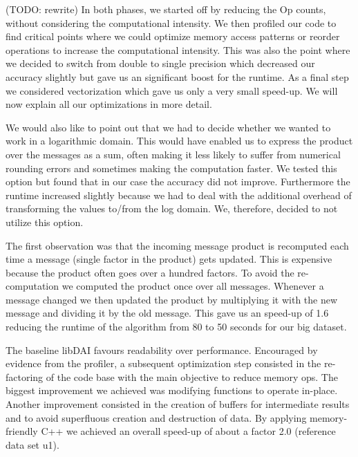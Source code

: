(TODO: rewrite) 
In both phases, we started off by reducing the Op counts, without considering the computational intensity. We then profiled our code to find critical points where we could optimize memory access patterns or reorder operations to increase the computational intensity. This was also the point where we decided to switch from double to single precision which decreased our accuracy slightly but gave us an significant boost for the runtime. %
As a final step we considered vectorization which gave us only a very small speed-up. We will now explain all our optimizations in more detail.

We would also like to point out that we had to decide whether we wanted to work in a logarithmic domain. This would have enabled us to express the product over the messages as a sum, often making it less likely to suffer from numerical rounding errors and sometimes making the computation faster. We tested this option but found that in our case the accuracy did not improve. Furthermore the runtime increased slightly because we had to deal with the additional overhead of transforming the values to/from the log domain. We, therefore, decided to not utilize this option.

The first observation was that the incoming message product is recomputed each time a message (single factor in the product) gets updated. This is expensive because the product often goes over a hundred factors. To avoid the re-computation we computed the product once over all messages. Whenever a message changed we then updated the product by multiplying it with the new message and dividing it by the old message. This gave us an speed-up of 1.6 reducing the runtime of the algorithm from 80 to 50 seconds for our big dataset.


The baseline libDAI favours readability over performance. Encouraged by evidence from the profiler, a subsequent optimization step consisted in the re-factoring of the code base with the main objective to reduce memory ops. The biggest improvement we achieved was modifying functions to operate in-place. Another improvement consisted in the creation of buffers for intermediate results and to avoid superfluous creation and destruction of data. 
By applying memory-friendly C++ we achieved an overall speed-up of about a factor 2.0 (reference data set u1).

